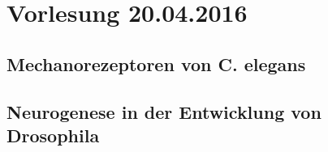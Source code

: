 \section{Vorlesung 20.04.2016}

\subsection{Mechanorezeptoren von C. elegans}

\subsection{Neurogenese in der Entwicklung von Drosophila}